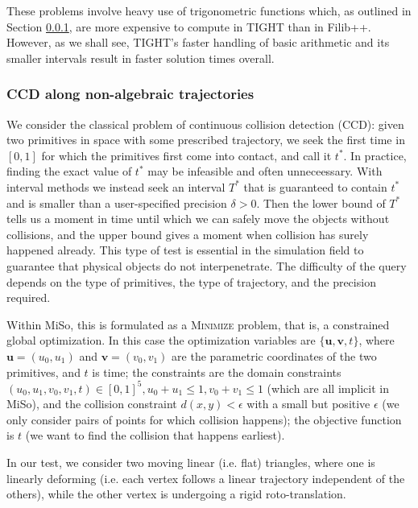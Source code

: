 These problems involve heavy use of trigonometric functions which, as outlined in Section \ref{}, are more expensive to compute in TIGHT  than in Filib++.
However, as we shall see, TIGHT's faster handling of basic arithmetic and its smaller intervals result in faster solution times overall.

\subsubsection{CCD along non-algebraic trajectories}
We consider the classical problem of continuous collision detection (CCD): given two primitives in space with some prescribed trajectory, we seek the first time in $[0,1]$ for which the primitives first come into contact, and call it $t^*$.
In practice, finding the exact value of $t^*$ may be infeasible and often unneceessary. With interval methods we instead seek an interval $T^*$ that is guaranteed to contain $t^*$ and is smaller than a user-specified precision $\delta>0$.
Then the lower bound of $T^*$ tells us a moment in time until which we can safely move the objects without collisions, and the upper bound gives a moment when collision has surely happened already.
This type of test is essential in the simulation field to guarantee that physical objects do not interpenetrate.
The difficulty of the query depends on the type of primitives, the type of trajectory, and the precision required.

Within MiSo, this is formulated as a \textsc{Minimize} problem, that is, a constrained global optimization.
In this case the optimization variables are $\{\mathbf{u}, \mathbf{v}, t\}$, where $\mathbf{u}=(u_0, u_1)$ and $\mathbf{v}=(v_0, v_1)$ are the parametric coordinates of the two primitives, and $t$ is time;
the constraints are the domain constraints $(u_0,u_1,v_0,v_1,t)\in[0,1]^5, u_0+u_1\leq1, v_0+v_1\leq1$ (which are all implicit in MiSo), and the collision constraint $d(x,y)<\epsilon$ with a small but positive $\epsilon$ (we only consider pairs of points for which collision happens);
the objective function is $t$ (we want to find the collision that happens earliest).

In our test, we consider two moving linear (i.e. flat) triangles, where one is linearly deforming (i.e. each vertex follows a linear trajectory independent of the others), while the other vertex is undergoing a rigid roto-translation.

